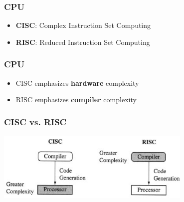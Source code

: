 \begin{frame}
  \frametitle{CPU}
  \begin{itemize}
    \item {\bf CISC}: Complex Instruction Set Computing
    \item {\bf RISC}: Reduced Instruction Set Computing
  \end{itemize}
\end{frame}

\begin{frame}
  \frametitle{CPU}
  \begin{itemize}
    \item CISC emphasizes {\bf hardware} complexity
    \item RISC emphasizes {\bf compiler} complexity
  \end{itemize}
\end{frame}

\begin{frame}
  \frametitle{CISC vs. RISC}
  \begin{center}
    \includegraphics[width=0.7\textwidth]{slides/te5009-embedded-architecture-soc/cisc_risc.jpg}\\
  \end{center}
\end{frame}
